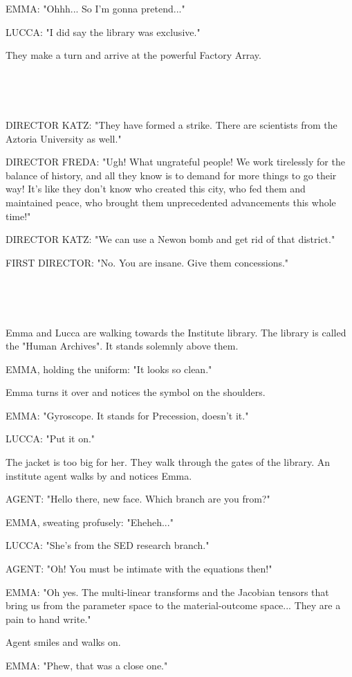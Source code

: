 \documentclass[11pt]{article}
\begin{document}
EMMA: "Ohhh... So I'm gonna pretend..."

LUCCA: "I did say the library was exclusive."

They make a turn and arrive at the powerful Factory Array.

\ 

\ 

DIRECTOR KATZ: "They have formed a strike.
There are scientists from the Aztoria University as well."

DIRECTOR FREDA: "Ugh! What ungrateful people! 
We work tirelessly for the balance of history, and all they know is to demand for more things to go their way!
It's like they don't know who created this city, who fed them and maintained peace, who brought them unprecedented advancements this whole time!"

DIRECTOR KATZ: "We can use a Newon bomb and get rid of that district."

FIRST DIRECTOR: "No. You are insane.
Give them concessions."

\ 

\ 

Emma and Lucca are walking towards the Institute library.
The library is called the "Human Archives".
It stands solemnly above them.

EMMA, holding the uniform: "It looks so clean."

Emma turns it over and notices the symbol on the shoulders.

EMMA: "Gyroscope. It stands for Precession, doesn't it."

LUCCA: "Put it on."

The jacket is too big for her.
They walk through the gates of the library.
An institute agent walks by and notices Emma.

AGENT: "Hello there, new face. Which branch are you from?"

EMMA, sweating profusely: "Eheheh..."

LUCCA: "She's from the SED research branch."

AGENT: "Oh! You must be intimate with the equations then!"

EMMA: "Oh yes. 
The multi-linear transforms and the Jacobian tensors that bring us from the parameter space to the material-outcome space...
They are a pain to hand write."

Agent smiles and walks on.

EMMA: "Phew, that was a close one."

\ 

\ 
\end{document}
